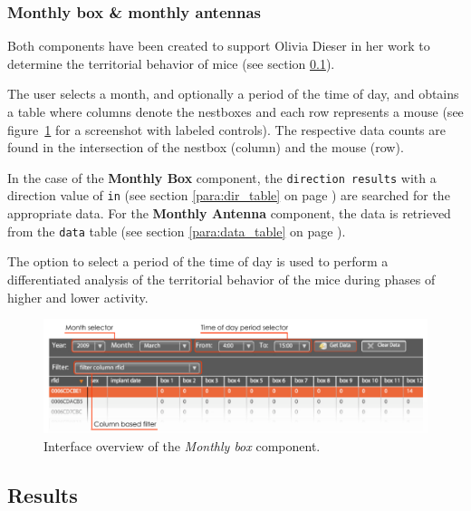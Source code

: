 \subsubsection{Monthly box \& monthly antennas}
\label{subsubsec:monthbox}

Both components have been created to support Olivia Dieser in her work to determine the territorial behavior of mice (see section \ref{subsec:results}).

The user selects a month, and optionally a period of the time of day, and obtains a table where columns denote the nestboxes and each row represents a mouse (see figure~\ref{fig:month_box_ant} for a screenshot with labeled controls). The respective data counts are found in the intersection of the nestbox (column) and the mouse (row).

In the case of the \textbf{Monthly Box} component, the \lstinline|direction results| with a direction value of \lstinline|in| (see section \ref{para:dir_table} on page \pageref{para:dir_table}) are searched for the appropriate data. For the \textbf{Monthly Antenna} component, the data is retrieved from the \lstinline|data| table (see section \ref{para:data_table} on page \pageref{para:data_table}).

The option to select a period of the time of day is used to perform a differentiated analysis of the territorial behavior of the mice during phases of higher and lower activity.

\begin{figure}[htpb]
\begin{center}
  \includegraphics[width=\textwidth]{assets/pdf/month_box_ant.pdf}
  \caption[\textit{Monthly box} component interface overview]{Interface overview of the \textit{Monthly box} component.}
  \label{fig:month_box_ant}
\end{center}
\end{figure}

\subsection{Results}
\label{subsec:results}
 
